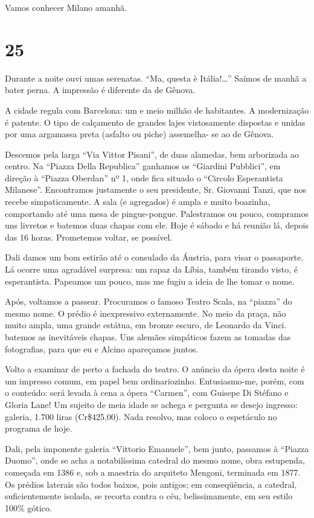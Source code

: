 Vamos conhecer Milano amanhã.

\section*{25 \adfflatleafright {}}
Durante a noite ouvi umas serenatas. “Ma, questa è Itália!\ldots” Saímos de manhã a bater perna. A impressão é diferente da de Gênova.

A cidade regula com Barcelona: um e meio milhão de habitantes. A modernização é patente. O tipo de calçamento de grandes lajes vistosamente dispostas e unidas por uma argamassa preta (asfalto ou piche) assemelha- se ao de Gênova.

Descemos pela larga “Via Vittor Pisani”, de duas alamedas, bem arborizada ao centro. Na “Piazza Della Republica” ganhamos os “Giardini Pubblici”, em direção à “Piazza Oberdan” nº 1, onde fica situado o “Circolo Esperantista Milanese”. Encontramos justamente o seu presidente, Sr. Giovanni Tanzi, que nos recebe simpaticamente. A sala (e agregados) é ampla e muito boazinha, comportando até uma mesa de pingue-pongue. Palestramos ou pouco, compramos uns livretos e batemos duas chapas com ele. Hoje é sábado e há reunião lá, depois das 16 horas. Prometemos voltar, se possível.

Dali damos um bom estirão até o consulado da Áustria, para visar o passaporte. Lá ocorre uma agradável surpresa: um rapaz da Líbia, também tirando visto, é esperantista. Papeamos um pouco, mas me fugiu a ideia de lhe tomar o nome.

Após, voltamos a passear. Procuramos o famoso Teatro Scala, na “piazza” do mesmo nome. O prédio é inexpressivo externamente. No meio da praça, não muito ampla, uma grande estátua, em bronze escuro, de Leonardo da Vinci. batemos as inevitáveis chapas. Uns alemães simpáticos fazem as tomadas das fotografias, para que eu e Alcino apareçamos juntos.

Volto a examinar de perto a fachada do teatro. O anúncio da ópera desta noite é um impresso comum, em papel bem ordinariozinho. Entusiasmo-me, porém, com o conteúdo: será levada à cena a ópera “Carmen”, com Guisepe Di Stéfano e Gloria Lane! Um sujeito de meia idade se achega e pergunta se desejo ingresso: galeria, 1.700 liras (Cr\$425,00). Nada resolvo, mas coloco o espetáculo no programa de hoje.

Dali, pela imponente galeria “Vittorio Emanuele”, bem junto, passamos à “Piazza Duomo”, onde se acha a notabilíssima catedral do mesmo nome, obra estupenda, começada em 1386 e, sob a maestria do arquiteto Mengoni, terminada em 1877. Os prédios laterais são todos baixos, pois antigos; em conseqüência, a catedral, suficientemente isolada, se recorta contra o céu, belissimamente, em seu estilo 100\% gótico.

